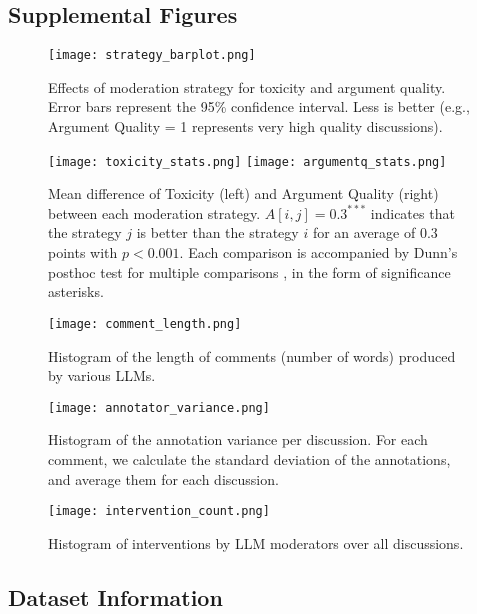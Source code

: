 \subsection{Supplemental Figures}
\label{ssec:appendix:analysis}


\begin{figure*}[t]
	\centering
	\texttt{[image: strategy\_barplot.png]}
	\caption{Effects of moderation strategy for toxicity and argument quality. Error bars represent the 95\% confidence interval. Less is better (e.g., Argument Quality = 1 represents very high quality discussions).}
	\label{fig::strategy_barplot}
\end{figure*}

\begin{figure*}[t]
    \texttt{[image: toxicity\_stats.png]} \hfill
    \texttt{[image: argumentq\_stats.png]}
	\centering
	\caption{Mean difference of Toxicity (left) and Argument Quality (right) between each moderation strategy. $A[i, j] = 0.3^{***}$ indicates that the strategy $j$ is better than the strategy $i$ for an average of $0.3$ points with $p<0.001$. Each comparison is accompanied by Dunn's posthoc test for multiple comparisons \cite{dunn}, in the form of significance asterisks.}
	\label{fig::toxicity_aq_stats}
\end{figure*}

\begin{figure}[H]
	\centering
	\texttt{[image: comment\_length.png]}
	\caption{Histogram of the length of comments (number of words) produced by various \acp{LLM}.}
	\label{fig::comment_length}
\end{figure}


\begin{figure}[H]
	\centering
	\texttt{[image: annotator\_variance.png]}
	\caption{Histogram of the annotation variance per discussion. For each comment, we calculate the standard deviation of the annotations, and average them for each discussion.}
	\label{fig::annotator_variance}
\end{figure}

\begin{figure}[H]
	\centering
	\texttt{[image: intervention\_count.png]}
	\caption{Histogram of interventions by LLM moderators over all discussions.}
	\label{fig::intervention_count}
\end{figure}


\subsection{Dataset Information}


